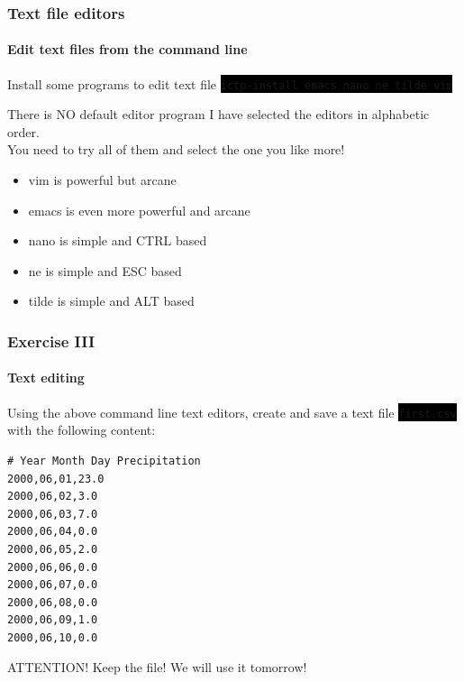 \documentclass[unknownkeysallowed, 10pt, a4 paper, handout]{beamer}
\newcommand{\code}[1]{\colorbox{black}{\color{green}\texttt{#1}}}
\begin{document}
\begin{frame}
  \frametitle{Text file editors}
  \framesubtitle{Edit text files from the command line}

  \begin{block}{Install some programs to edit text file}
  \code{ictp-install emacs nano ne tilde vim} \\
  \end{block}

  \begin{alertblock}{There is NO default editor program}
  I have selected the editors in alphabetic order.\\
  You need to try all of them and select the one you like more!
  \end{alertblock}

  \begin{exampleblock}{}
    \begin{itemize}
      \item vim is powerful but arcane
      \item emacs is even more powerful and arcane
      \item nano is simple and CTRL based
      \item ne is simple and ESC based
      \item tilde is simple and ALT based
    \end{itemize}
  \end{exampleblock}
\end{frame}


\begin{frame}[fragile=singleslide]
  \frametitle{Exercise III}
  \framesubtitle{Text editing}
  \begin{exampleblock}{}
    Using the above command line text editors, create and save a text file
    \code{first.csv} with the following content:
   \begin{verbatim}
# Year Month Day Precipitation
2000,06,01,23.0
2000,06,02,3.0
2000,06,03,7.0
2000,06,04,0.0
2000,06,05,2.0
2000,06,06,0.0
2000,06,07,0.0
2000,06,08,0.0
2000,06,09,1.0
2000,06,10,0.0
    \end{verbatim}
  \end{exampleblock}
  \begin{alertblock}{ATTENTION!}
    Keep the file! We will use it tomorrow!
  \end{alertblock}
\end{frame}
\end{document}
